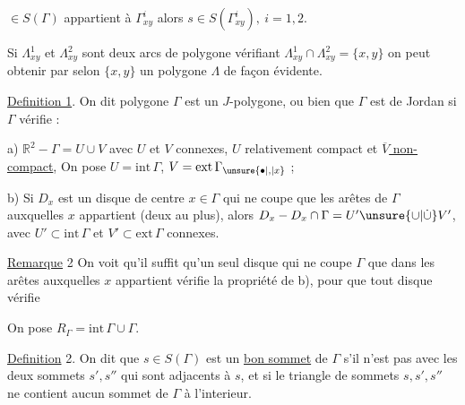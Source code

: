 $\in S(\Gamma)$ appartient à $\Gamma^{i}_{xy}$ alors $s\in S(\Gamma^{i}_{xy}),\ i=1,2$.

Si $\Lambda^{1}_{xy}$ et $\Lambda^{2}_{xy}$ sont deux arcs de polygone vérifiant \margin{$\bullet$}$\Lambda^{1}_{xy}\cap\Lambda^{2}_{xy}=\{x,y\}$ on peut obtenir par  selon $\{x,y\}$ un polygone $\Lambda$ de façon évidente.

%
\margin{$\bullet$}\uline{Definition 1}. On dit  polygone $\Gamma$ est un $J$-polygone, ou bien que $\Gamma$ est de Jordan si $\Gamma$ vérifie :

a) $\mathbb{R}^{2}-\Gamma=U\cup V$ avec $U$ et $V$ connexes, $U$ relativement compact et \uline{$\overline{V}$ non-compact}, On pose $U=\mathrm{int}\,\Gamma$, $V=\mathrm{ext}\,\Gamma_{\unsure{\bullet|,|x}}$ ;

b) Si $D_{x}$ est un disque de centre $x\in\Gamma$ qui ne coupe que les arêtes de $\Gamma$ auxquelles $x$ appartient (deux au plus), alors $D_{x}-D_{x}\cap\Gamma=U'\unsure{\cup|\mathbin{\dot\cup}}V'$, avec $U'\subset\mathrm{int}\,\Gamma$ et $V'\subset\mathrm{ext}\,\Gamma$ connexes.

%
\uline{Remarque} 2 On voit qu'il suffit qu'un seul disque  qui ne coupe $\Gamma$  que dans les  arêtes auxquelles $x$ appartient vérifie la propriété de b), pour que tout   disque  vérifie 

On pose $R_{\Gamma}=\mathrm{int}\,\Gamma\cup\Gamma$.

\margin{$\cdot$}\uline{Definition} 2. On dit que $s\in S(\Gamma)$ est un \uline{bon sommet} de $\Gamma$ s'il \margin{\unsure{,}}n'est pas  avec les deux sommets $s',s''$ qui sont adjacents à $s$, et si le triangle de sommets $s,s',s''$ ne contient aucun sommet de $\Gamma$ à l'interieur. 

